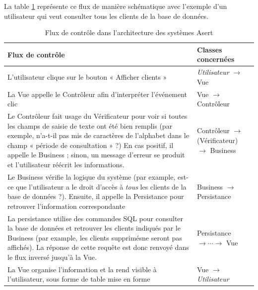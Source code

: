 La table \ref{flux} représente ce flux de manière schématique avec l'exemple d'un utilisateur qui veut consulter tous les clients de la base de données.

\begin{table}[ht]
\begin{center}
    \begin{tabular}{ | p{8.5cm} | p{5cm} |}
    \hline
    \textbf{Flux de contrôle} & \textbf{Classes concernées} \\ \hline
    L'utilisateur clique sur le bouton « Afficher clients »  & \textit{Utilisateur} $\rightarrow$ Vue \\ \hline
    La Vue appelle le Contrôleur afin d'interpréter l'événement clic & Vue $\rightarrow$ Contrôleur \\ \hline
    Le Contrôleur fait usage du Vérificateur pour voir si toutes les champs de saisie de texte ont été bien remplis 
    	(par exemple, n'a-t-il pas mis de caractères de l'alphabet dans le champ « période de consultation » ?)
    	En cas positif, il appelle le Business ; sinon, un message d'erreur se produit et l'utilisateur réécrit les informations. 
    	& Contrôleur $\rightarrow$ (Vérificateur) $\rightarrow$ Business \\ \hline
    Le Business vérifie la logique du système (par example, est-ce que l'utilisateur a le droit d'accès à 
    \textit{tous} les clients de la base de données ?).
    	Ensuite, il appelle la Persistance pour retrouver l'information correspondante
    	& Business  $\rightarrow$ Persistance \\ \hline
    La persistance utilise des commandes SQL pour consulter la base de données et retrouver les clients indiqués par le Business 
    	(par example, les clients supprimés\footnotemark[1] ne seront pas affichés). 
    	La réponse de cette requête est donc renvoyé dans le flux inversé jusqu'à la Vue. 
    	& Persistance $\rightarrow \cdots \rightarrow$ Vue \\ \hline
    La Vue organise l'information et la rend visible à l'utilisateur, sous forme de table mise en forme 
    	& Vue $\rightarrow$ \textit{Utilisateur} \\
    \hline
    \end{tabular}
\end{center}
\caption{Flux de contrôle dans l'architecture des systèmes Asert}\label{flux}
\end{table}